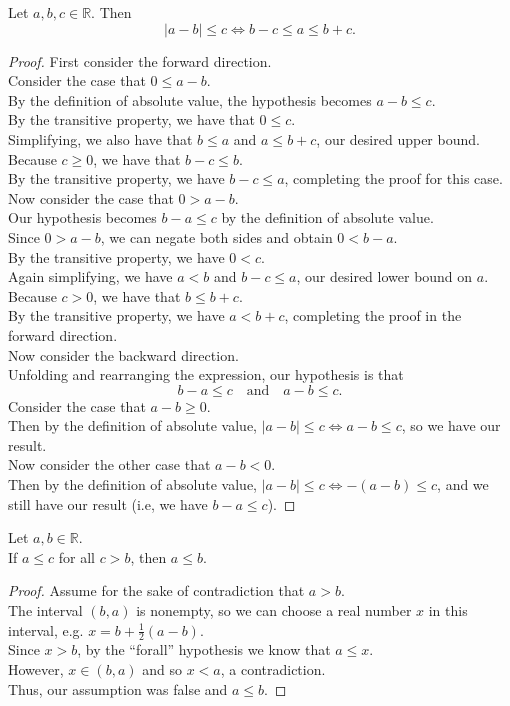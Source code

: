 \documentclass{article}
\newenvironment{theorem}[1]{\renewcommand\theinnercustomthm{#1}\innercustomthm}
  {\endinnercustomthm}
\begin{document}
\newpage{}
\begin{theorem}{2}
Let $a,b,c\in\mathbb R$. Then 
\[|a-b| \le c \iff b-c \le a \le b + c.\]
\end{theorem}
\begin{proof}
First consider the forward direction. \\
Consider the case that $0 \le a-b$. \\
By the definition of absolute value, the hypothesis becomes $a - b \le c$. \\
By the transitive property, we have that $0 \le c$. \\
Simplifying, we also have that $b \le a$ and $a \le b + c$, our desired upper bound. \\
Because $c \ge 0$, we have that $b - c \le b$. \\
By the transitive property, we have $b -c \le a$, completing the proof for this case. \\
Now consider the case that $0 > a - b$. \\
Our hypothesis becomes $b - a \le c$ by the definition of absolute value. \\
Since $0 > a - b$, we can negate both sides and obtain $0 < b - a$.\\
By the transitive property, we have $0 < c$. \\
Again simplifying, we have $a < b$ and $b -c \le a$, our desired lower bound on $a$. \\
Because $c > 0$, we have that $b \le b + c$.\\
By the transitive property, we have $a < b + c$, completing the proof in the forward direction. \\
Now consider the backward direction. \\
Unfolding and rearranging the expression, our hypothesis is that \[b - a \le c \quad\text{and}\quad a - b \le c.\]
Consider the case that $a - b \ge 0$. \\
Then by the definition of absolute value, $|a-b| \le c \iff a - b \le c$, so we have our result. \\
Now consider the other case that $a - b < 0$. \\
Then by the definition of absolute value, $|a-b| \le c \iff -(a -b)\le c$, and we still have our result (i.e, we have $b-a\le c$).
\end{proof}

\begin{theorem}{3}
Let $a,b \in \mathbb R$. \\ If $a \le c$ for all $c > b$, then $a \le b$.
\end{theorem}
\begin{proof}
Assume for the sake of contradiction that $a > b$. \\ The interval $(b, a)$ is nonempty, so we can choose a real number $x$ in this interval, e.g. $x = b + \frac{1}{2}(a-b)$. \\ Since $x > b$, by the ``forall'' hypothesis we know that $a \le x$. \\
However, $x \in (b,a)$ and so $x < a$, a contradiction. \\ Thus, our assumption was false and $a \le b$.
\end{proof}
\end{document}
